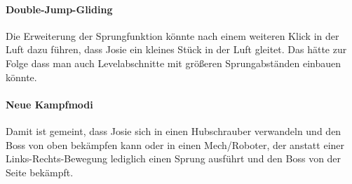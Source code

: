 \paragraph{Double-Jump-Gliding}
Die Erweiterung der Sprungfunktion könnte nach einem weiteren Klick in der Luft dazu führen, dass Josie ein kleines Stück in der Luft gleitet. Das hätte zur Folge dass man auch Levelabschnitte mit größeren Sprungabständen einbauen könnte.

\paragraph{Neue Kampfmodi}
Damit ist gemeint, dass Josie sich in einen Hubschrauber verwandeln und den Boss von oben bekämpfen kann oder in einen Mech/Roboter, der anstatt einer Links-Rechts-Bewegung lediglich einen Sprung ausführt und den Boss von der Seite bekämpft.
